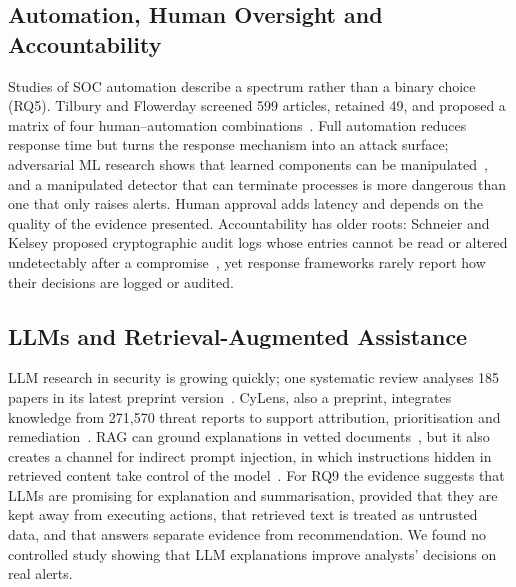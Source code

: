 \documentclass[conference]{IEEEtran}
\begin{document}
\subsection{Automation, Human Oversight and Accountability}
Studies of SOC automation describe a spectrum rather than a binary choice (RQ5). Tilbury and Flowerday screened 599 articles, retained 49, and proposed a matrix of four human--automation combinations~\cite{tilbury2024humans}. Full automation reduces response time but turns the response mechanism into an attack surface; adversarial ML research shows that learned components can be manipulated~\cite{biggio2018wild}, and a manipulated detector that can terminate processes is more dangerous than one that only raises alerts. Human approval adds latency and depends on the quality of the evidence presented. Accountability has older roots: Schneier and Kelsey proposed cryptographic audit logs whose entries cannot be read or altered undetectably after a compromise~\cite{schneier1999secure}, yet response frameworks rarely report how their decisions are logged or audited.

\subsection{LLMs and Retrieval-Augmented Assistance}
LLM research in security is growing quickly; one systematic review analyses 185 papers in its latest preprint version~\cite{xu2024llm}. CyLens, also a preprint, integrates knowledge from 271,570 threat reports to support attribution, prioritisation and remediation~\cite{liu2025cylens}. RAG can ground explanations in vetted documents~\cite{lewis2020retrieval}, but it also creates a channel for indirect prompt injection, in which instructions hidden in retrieved content take control of the model~\cite{greshake2023indirect}. For RQ9 the evidence suggests that LLMs are promising for explanation and summarisation, provided that they are kept away from executing actions, that retrieved text is treated as untrusted data, and that answers separate evidence from recommendation. We found no controlled study showing that LLM explanations improve analysts' decisions on real alerts.

\end{document}
